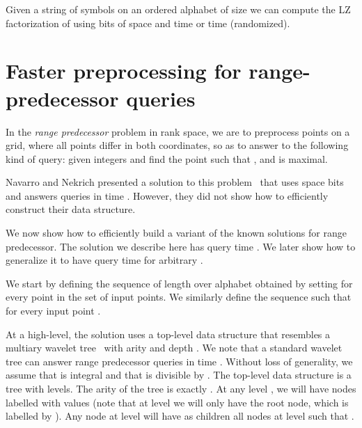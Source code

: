 \documentclass[11pt,runningheads]{llncs}
\begin{document}
{\begin{theorem}
\label{lz-compact-space}
Given a string  of  symbols on an ordered alphabet of size  we can compute 
the LZ factorization of  using  bits of space and  
time or  time (randomized).
\end{theorem}

\section{Faster preprocessing for range-predecessor queries}
\label{sec-rangepred}

In the {\em range predecessor} problem in rank space, we are to preprocess 
 points on a  grid, where all points  
differ in both coordinates, so as to answer to the following 
kind of query: given integers  and  find the point 
such that ,  and  is maximal. 


Navarro and Nekrich presented a solution to this problem~\cite{nn2012} 
that uses space  bits and  
answers queries in time .
However, they did not show how to efficiently construct their data structure. 




We now show how 
to efficiently build a variant of the known solutions 
for range predecessor. The solution we describe here has query 
time . We later show how to generalize it 
to have query time  for arbitrary . 

We start by defining the sequence  of length  over alphabet  
obtained by setting  for every point  in the set of input points. 
We similarly define the sequence  such that  for every input 
point .

At a high-level, the solution uses a top-level data structure that resembles 
a multiary wavelet tree~\cite{FMMN07} with arity 
and depth . We note that a standard wavelet tree can answer 
range predecessor queries in time . 
Without loss of generality, we assume that  is 
integral and that  is divisible by . 
The top-level data structure is a tree 
with  levels. The arity of the tree is exactly 
. 
At any level , we will have 
nodes labelled with values 
(note that at level  we will only have the root 
node, which is labelled by ). 
Any node  at level  will have as children all nodes 
 at level  such that . 


}
\end{document}
